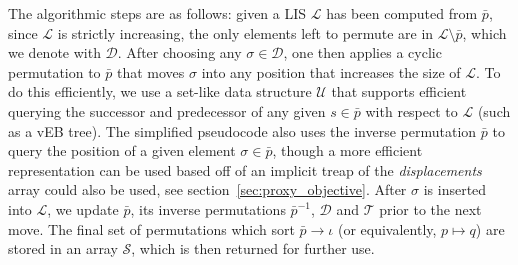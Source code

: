 \documentclass[sn-mathphys]{sn-jnl}
\begin{document}
The algorithmic steps are as follows: given a LIS $\mathcal{L}$ has been computed from $\bar{p}$, since $\mathcal{L}$ is strictly increasing, the only elements left to permute are in $\mathcal{L} \setminus \bar{p}$, which we denote with $\mathcal{D}$.
After choosing any $\sigma \in \mathcal{D}$, one then applies a cyclic permutation to $\bar{p}$ that moves $\sigma$ into any position that increases the size of $\mathcal{L}$. To do this efficiently, we use a set-like data structure $\mathcal{U}$ that supports efficient querying the successor and predecessor of any given $s \in \bar{p}$ with respect to $\mathcal{L}$ (such as a vEB tree). 
The simplified pseudocode also uses the inverse permutation $\bar{p}$ to query the position of a given element $\sigma \in \bar{p}$, though a more efficient representation can be used based off of an implicit treap of the \emph{displacements} array could also be used, see section~\ref{sec:proxy_objective}.
After $\sigma$ is inserted into $\mathcal{L}$, we update $\bar{p}$, its inverse permutations $\bar{p}^{-1}$, $\mathcal{D}$ and $\mathcal{T}$ prior to the next move. The final set of permutations which sort $\bar{p} \to \iota$ (or equivalently, $p \mapsto q$) are stored in an array $\mathcal{S}$, which is then returned for further use. 
\end{document}
